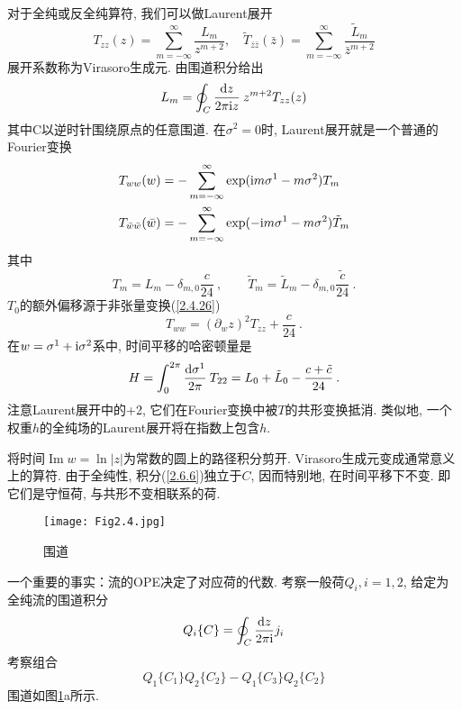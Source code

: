 对于全纯或反全纯算符, 我们可以做Laurent展开
\begin{equation}
T_{z z}(z)=\sum_{m=-\infty}^{\infty} \frac{L_{m}}{z^{m+2}}, \quad \tilde{T}_{\bar{z} \bar{z}}(\bar{z})=\sum_{m=-\infty}^{\infty} \frac{\tilde{L}_{m}}{\bar{z}^{m+2}} \label{2.6.5}
\end{equation}
展开系数称为Virasoro生成元. 由围道积分给出
\begin{equation}\label{2.6.6}
L_{m}=\oint_{C} \frac{\mathrm{d} z}{2 \pi \mathrm{i} z} \: z^{m+2} T_{z z}(z)
\end{equation}
其中C以逆时针围绕原点的任意围道. 在$\sigma^2=0$时, Laurent展开就是一个普通的Fourier变换
\begin{subequations} \label{2.6.7}
\begin{align}
T_{w w}(w)&=-\sum_{m=-\infty}^{\infty} \exp (\mathrm{i} m \sigma^{1}-m \sigma^{2}) T_{m}   \label{2.6.7a}\\
T_{\bar{w} \bar{w}}(\bar{w})&=-\sum_{m=-\infty}^{\infty} \exp (-\mathrm{i} m \sigma^{1}-m \sigma^{2}) \tilde{T}_{m} \label{2.6.7b}
\end{align}
\end{subequations}
其中
\begin{equation}\label{2.6.8}
T_{m}=L_{m}-\delta_{m, 0} \frac{c}{24} \:, \qquad \tilde{T}_{m}=\tilde{L}_{m}-\delta_{m, 0} \frac{\tilde{c}}{24} \:.
\end{equation}
$T_0$的额外偏移源于非张量变换(\ref{2.4.26})
\begin{equation}
T_{w w}=(\partial_{w} z)^{2} T_{z z}+\frac{c}{24} \:.
\end{equation}
在$w=\sigma^{1}+\mathrm{i} \sigma^{2}$系中, 时间平移的哈密顿量是
\begin{equation}\label{2.6.10}
H=\int_{0}^{2 \pi} \frac{\mathrm{d} \sigma^{1}}{2 \pi} \: T_{22}=L_{0}+\tilde{L}_{0}-\frac{c+\tilde{c}}{24} \:.
\end{equation}
注意Laurent展开中的+2, 它们在Fourier变换中被$T$的共形变换抵消. 类似地, 一个权重$h$的全纯场的Laurent展开将在指数上包含$h$.

将时间$\operatorname{Im} w=\ln |z|$为常数的圆上的路径积分剪开. Virasoro生成元变成通常意义上的算符. 由于全纯性, 积分(\ref{2.6.6})独立于$C$, 因而特别地, 在时间平移下不变. 即它们是守恒荷, 与共形不变相联系的荷. 

\begin{figure}[h]
	\begin{center}
		\texttt{[image: Fig2.4.jpg]}\\
		\caption{围道}\label{Fig2.4}
	\end{center}
\end{figure}
一个重要的事实：流的OPE决定了对应荷的代数. 考察一般荷$Q_{i}, i=1,2$, 给定为全纯流的围道积分
\begin{equation}
Q_{i}\{C\}=\oint_{C} \frac{\mathrm{d} z}{2 \pi \mathrm{i}} j_{i}
\end{equation}
考察组合
\begin{equation}\label{2.6.12}
Q_{1}\{C_{1}\} Q_{2}\{C_{2}\}-Q_{1}\{C_{3}\} Q_{2}\{C_{2}\}
\end{equation}
围道如图\ref{Fig2.4}a所示.


